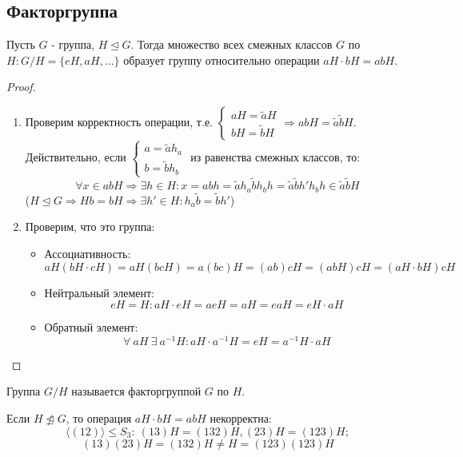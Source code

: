 \subsection{Факторгруппа}
\begin{subtheorem}
    Пусть $G$ - группа, $H\unlhd G$. Тогда множество всех смежных классов $G$ по $H : G/H = \{eH, aH, ...\}$ образует группу относительно операции $aH \cdot bH = abH$.
\end{subtheorem}
\begin{proof}\tab
    \begin{enumerate}
        \item Проверим корректность операции, т.е. $\begin{cases}
            aH = \tilde{a}H\\
            bH = \tilde{b}H
        \end{cases} \Longrightarrow abH = \tilde{a}\tilde{b}H$.\\
        Действительно, если $\begin{cases}
            a = \tilde{a}h_a\\
            b = \tilde{b}h_b
        \end{cases}$ из равенства смежных классов, то:
        \[\forall x \in abH \Longrightarrow \exists h\in H: x = abh = \tilde{a}h_a\tilde{b}h_bh = \tilde{a}\tilde{b}h'h_bh \in \tilde{a}\tilde{b}H\]
        ($H \unlhd G \Longrightarrow Hb = bH \Longrightarrow \exists h' \in H: h_a\tilde{b} = \tilde{b}h'$)
        \item Проверим, что это группа:
        \begin{itemize}
            \item Ассоциативность:
            \[aH(bH\cdot cH) = aH(bcH) = a(bc)H = (ab)cH = (abH)cH = (aH\cdot bH)cH\]
            \item Нейтральный элемент:
            \[eH = H: aH \cdot eH = aeH = aH = eaH = eH\cdot aH\]
            \item Обратный элемент:
            \[\forall \ aH \ \exists \ a^{-1}H: aH \cdot a^{-1}H = eH = a^{-1}H \cdot aH\]
        \end{itemize}
    \end{enumerate}
\end{proof}
\begin{definition}
    Группа $G/H$ называется факторгруппой $G$ по $H$.
\end{definition}
\begin{remark}
    Если $H \ntrianglelefteq G$, то операция $aH\cdot bH = abH$ некорректна:
    \[\langle(12)\rangle \leq S_3: \ (13)H = (132)H, (23)H = (123)H;\]
    \[(13)(23)H = (132)H \neq H = (123)(123)H\]
\end{remark}
